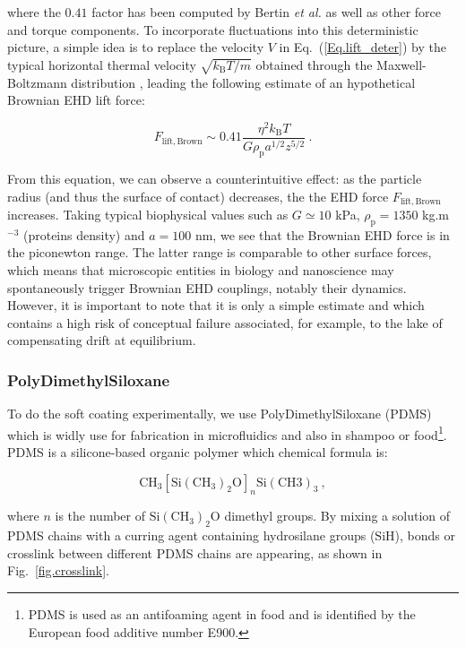  where the $0.41$ factor has been computed by Bertin \textit{et al.} \cite{bertin_soft-lubrication_2021} as well as other force and torque components. To incorporate fluctuations into this deterministic picture, a simple idea is to replace the velocity $V$ in Eq.~(\ref{Eq.lift_deter}) by the typical horizontal thermal velocity $\sqrt{k_\mathrm{B}T / m}$ obtained through the Maxwell-Boltzmann distribution , leading the following estimate of an hypothetical Brownian \gls{EHD} lift force:

\begin{equation}
	F_\mathrm{lift, Brown} \sim 0.41\frac{\eta ^2 k_\mathrm{B}T}{G\rho_\mathrm{p} a^{1/2} z^{5/2}} ~.
	\label{Eq.lift_brown}
\end{equation}


From this equation, we can observe a counterintuitive effect: as the particle radius (and thus the surface of contact) decreases, the the \gls{EHD} force $F_\mathrm{lift, Brown}$ increases. Taking typical biophysical values such as $G \simeq 10$ kPa, $\rho_\mathrm{p} = 1350$ kg.m$^{-3}$ (proteins density) and $a=100$ nm, we see that the Brownian \gls{EHD} force is in the piconewton range. The latter range is comparable to other surface forces, which means that microscopic entities in biology and nanoscience may spontaneously trigger Brownian \gls{EHD} couplings, notably their dynamics. However, it is important to note that it is only a simple estimate and which contains a high risk of conceptual failure associated, for example, to the lake of compensating drift at equilibrium. 

\subsubsection{PolyDimethylSiloxane}
To do the soft coating experimentally, we use PolyDimethylSiloxane (\gls{PDMS}) which is widly use for fabrication in microfluidics and also in shampoo \cite{im_shampoo_2012} or food\footnote{ \gls{PDMS} is used as an antifoaming agent in food and is identified by the European food additive number E900.}. \gls{PDMS} is a silicone-based organic polymer which chemical formula is:

\begin{equation}
	\mathrm{CH_3[Si(CH_3)_2 O]}_n \mathrm{Si(CH3)_3} ~,
\end{equation}

where $n$ is the number of $\mathrm{Si(CH_3)_2 O}$ dimethyl groups. By mixing a solution of \gls{PDMS} chains with a curring agent containing hydrosilane groups ($\mathrm{SiH}$), bonds or crosslink between different \gls{PDMS} chains are appearing, as shown in Fig.~\ref{fig.crosslink}.




